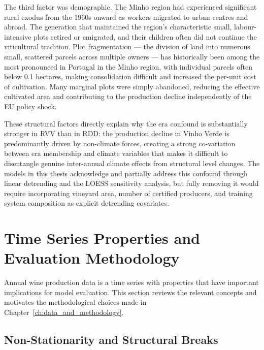The third factor was demographic. The Minho region had experienced significant rural exodus from the 1960s onward as workers migrated to urban centres and abroad. The generation that maintained the region's characteristic small, labour-intensive plots retired or emigrated, and their children often did not continue the viticultural tradition. Plot fragmentation --- the division of land into numerous small, scattered parcels across multiple owners --- has historically been among the most pronounced in Portugal in the Minho region, with individual parcels often below 0.1 hectares, making consolidation difficult and increased the per-unit cost of cultivation. Many marginal plots were simply abandoned, reducing the effective cultivated area and contributing to the production decline independently of the EU policy shock.

These structural factors directly explain why the era confound is substantially stronger in RVV than in RDD: the production decline in Vinho Verde is predominantly driven by non-climate forces, creating a strong co-variation between era membership and climate variables that makes it difficult to disentangle genuine inter-annual climate effects from structural level changes. The models in this thesis acknowledge and partially address this confound through linear detrending and the LOESS sensitivity analysis, but fully removing it would require incorporating vineyard area, number of certified producers, and training system composition as explicit detrending covariates.


\section{Time Series Properties and Evaluation Methodology}\label{sec:time_series_properties_and}

Annual wine production data is a time series with properties that have important implications for model evaluation. This section reviews the relevant concepts and motivates the methodological choices made in Chapter~\ref{ch:data_and_methodology}.


\subsection{Non-Stationarity and Structural Breaks}\label{sub:nonstationarity_and_structural_breaks}

